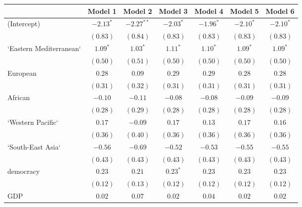 
\begin{table}[!h]
\begin{center}
\begin{tabular}{l c c c c c c }
\toprule
 & Model 1 & Model 2 & Model 3 & Model 4 & Model 5 & Model 6 \\
\midrule
(Intercept)             & $-2.13^{*}$  & $-2.27^{**}$ & $-2.03^{*}$  & $-1.96^{*}$  & $-2.10^{*}$  & $-2.10^{*}$  \\
                        & $(0.83)$     & $(0.84)$     & $(0.83)$     & $(0.83)$     & $(0.83)$     & $(0.83)$     \\
`Eastern Mediterranean` & $1.09^{*}$   & $1.03^{*}$   & $1.11^{*}$   & $1.10^{*}$   & $1.09^{*}$   & $1.09^{*}$   \\
                        & $(0.50)$     & $(0.51)$     & $(0.50)$     & $(0.50)$     & $(0.50)$     & $(0.50)$     \\
European                & $0.28$       & $0.09$       & $0.29$       & $0.29$       & $0.28$       & $0.28$       \\
                        & $(0.31)$     & $(0.32)$     & $(0.31)$     & $(0.31)$     & $(0.31)$     & $(0.31)$     \\
African                 & $-0.10$      & $-0.11$      & $-0.08$      & $-0.08$      & $-0.09$      & $-0.09$      \\
                        & $(0.28)$     & $(0.29)$     & $(0.28)$     & $(0.28)$     & $(0.28)$     & $(0.28)$     \\
`Western Pacific`       & $0.17$       & $-0.09$      & $0.17$       & $0.13$       & $0.17$       & $0.16$       \\
                        & $(0.36)$     & $(0.40)$     & $(0.36)$     & $(0.36)$     & $(0.36)$     & $(0.36)$     \\
`South-East Asia`       & $-0.56$      & $-0.69$      & $-0.52$      & $-0.53$      & $-0.55$      & $-0.55$      \\
                        & $(0.43)$     & $(0.43)$     & $(0.43)$     & $(0.43)$     & $(0.43)$     & $(0.43)$     \\
democracy               & $0.23$       & $0.21$       & $0.23^{*}$   & $0.23$       & $0.23$       & $0.23$       \\
                        & $(0.12)$     & $(0.13)$     & $(0.12)$     & $(0.12)$     & $(0.12)$     & $(0.12)$     \\
GDP                     & $0.02$       & $0.07$       & $0.02$       & $0.04$       & $0.02$       & $0.02$       \\

\end{tabular}
\end{center}
\end{table}
